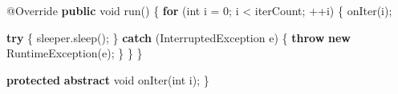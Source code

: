 \documentclass[11pt]{article}
\newenvironment{Shaded}{}{}
\newcommand{\KeywordTok}[1]{\textcolor[rgb]{0.00,0.44,0.13}{\textbf{{#1}}}}
\newcommand{\DataTypeTok}[1]{\textcolor[rgb]{0.56,0.13,0.00}{{#1}}}
\newcommand{\DecValTok}[1]{\textcolor[rgb]{0.25,0.63,0.44}{{#1}}}
\newcommand{\FunctionTok}[1]{\textcolor[rgb]{0.02,0.16,0.49}{{#1}}}
\newcommand{\NormalTok}[1]{{#1}}
\newcommand{\ControlFlowTok}[1]{\textcolor[rgb]{0.00,0.44,0.13}{\textbf{{#1}}}}
\newcommand{\OperatorTok}[1]{\textcolor[rgb]{0.40,0.40,0.40}{{#1}}}
\newcommand{\BuiltInTok}[1]{{#1}}
\newcommand{\AttributeTok}[1]{\textcolor[rgb]{0.49,0.56,0.16}{{#1}}}
\begin{document}
\begin{Shaded}
\begin{Highlighting}[]
    \AttributeTok{@Override}
    \KeywordTok{public} \DataTypeTok{void} \FunctionTok{run}\OperatorTok{()} \OperatorTok{\{}
        \ControlFlowTok{for} \OperatorTok{(}\DataTypeTok{int}\NormalTok{ i }\OperatorTok{=} \DecValTok{0}\OperatorTok{;}\NormalTok{ i }\OperatorTok{\textless{}}\NormalTok{ iterCount}\OperatorTok{;} \OperatorTok{++}\NormalTok{i}\OperatorTok{)} \OperatorTok{\{}
            \FunctionTok{onIter}\OperatorTok{(}\NormalTok{i}\OperatorTok{);}

            \ControlFlowTok{try} \OperatorTok{\{}
\NormalTok{                sleeper}\OperatorTok{.}\FunctionTok{sleep}\OperatorTok{();}
            \OperatorTok{\}} \ControlFlowTok{catch} \OperatorTok{(}\BuiltInTok{InterruptedException}\NormalTok{ e}\OperatorTok{)} \OperatorTok{\{}
                \ControlFlowTok{throw} \KeywordTok{new} \BuiltInTok{RuntimeException}\OperatorTok{(}\NormalTok{e}\OperatorTok{);}
            \OperatorTok{\}}
        \OperatorTok{\}}
    \OperatorTok{\}}

    \KeywordTok{protected} \KeywordTok{abstract} \DataTypeTok{void} \FunctionTok{onIter}\OperatorTok{(}\DataTypeTok{int}\NormalTok{ i}\OperatorTok{);}
\OperatorTok{\}}
\end{Highlighting}
\end{Shaded}
\end{document}
